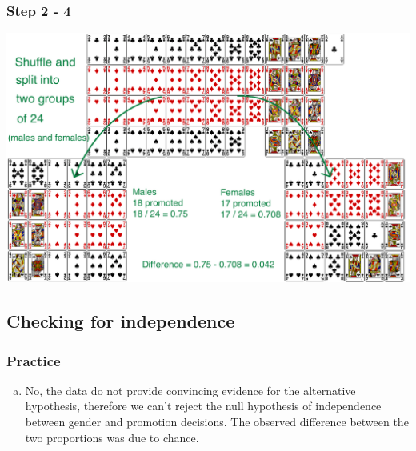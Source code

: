 
\begin{frame}
\frametitle{Step 2 - 4}

\begin{center}
\includegraphics[width=\textwidth]{1-8_gender_discrimination/figures/step2}
\end{center}

\end{frame}



\subsection{Checking for independence}


\begin{frame}
\frametitle{Practice}


\begin{enumerate}[(a)]
\item No, the data do not provide convincing evidence for the alternative hypothesis, therefore we can't reject the null hypothesis of independence between gender and promotion decisions. The observed difference between the two proportions was due to chance.
\end{enumerate}

\end{frame}

